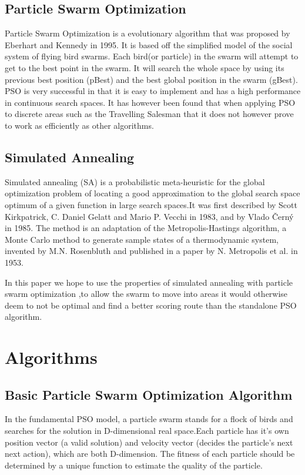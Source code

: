\documentclass{article}[]
\begin{document}
\subsection{Particle Swarm Optimization}
Particle Swarm Optimization is a evolutionary algorithm that was proposed by Eberhart and Kennedy in 1995\cite{Kennedy1995}. It is based off the simplified model of the social system of flying bird swarms. Each bird(or particle) in the swarm will attempt to get to the best point in the swarm. It will search the whole space by using its previous best position (pBest) and the best global position in the swarm (gBest). PSO is very successful in that it is easy to implement and has a high performance in continuous search spaces. It has however been found that when applying PSO to discrete areas such as the Travelling Salesman that it does not however prove to work as efficiently as other algorithms.

\subsection{Simulated Annealing}
Simulated annealing (SA) is a probabilistic meta-heuristic for the global optimization problem of locating a good approximation to the global search space optimum of a given function in large search spaces.It was first described by Scott Kirkpatrick, C. Daniel Gelatt and Mario P. Vecchi in 1983,\cite{Kirkpatrick1983} and by Vlado Černý in 1985\cite{JournalofOptimizationTheoryandApplications1985}. The method is an adaptation of the Metropolis-Hastings algorithm, a Monte Carlo method to generate sample states of a thermodynamic system, invented by M.N. Rosenbluth and published in a paper by N. Metropolis et al. in 1953.\cite{Metropolis1953}

In this paper we hope to use the properties of simulated annealing with particle swarm optimization ,to allow the swarm to move into areas it would otherwise deem to not be optimal and find a better scoring route than the standalone PSO algorithm. 

\newpage
\section{Algorithms}
\subsection{Basic Particle Swarm Optimization Algorithm}
In the fundamental PSO model, a particle swarm stands for a flock of birds and searches for the solution in D-dimensional real space.Each particle has it's own position vector (a valid solution) and velocity vector (decides the particle's next next action), which are both D-dimension. The fitness of each particle should be determined by a unique function to estimate the quality of the particle.
 
\end{document}
